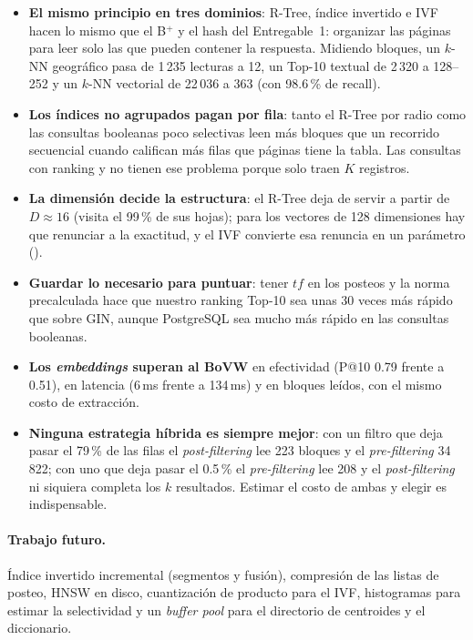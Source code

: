 \begin{itemize}
\item \textbf{El mismo principio en tres dominios}: R-Tree, índice invertido e IVF hacen lo mismo que
  el B$^+$ y el hash del Entregable~1: organizar las páginas para leer solo las que pueden contener la
  respuesta. Midiendo bloques, un $k$-NN geográfico pasa de 1\,235 lecturas a 12, un Top-10 textual
  de 2\,320 a 128--252 y un $k$-NN vectorial de 22\,036 a 363 (con 98.6\,\% de recall).
\item \textbf{Los índices no agrupados pagan por fila}: tanto el R-Tree por radio como las consultas
  booleanas poco selectivas leen más bloques que un recorrido secuencial cuando califican más filas
  que páginas tiene la tabla. Las consultas con ranking y  no tienen ese problema porque
  solo traen $K$ registros.
\item \textbf{La dimensión decide la estructura}: el R-Tree deja de servir a partir de $D\approx16$
  (visita el 99\,\% de sus hojas); para los vectores de 128 dimensiones hay que renunciar a la
  exactitud, y el IVF convierte esa renuncia en un parámetro ().
\item \textbf{Guardar lo necesario para puntuar}: tener $tf$ en los posteos y la norma precalculada
  hace que nuestro ranking Top-10 sea unas 30 veces más rápido que  sobre GIN, aunque
  PostgreSQL sea mucho más rápido en las consultas booleanas.
\item \textbf{Los \emph{embeddings} superan al BoVW} en efectividad (P@10 0.79 frente a 0.51), en
  latencia (6\,ms frente a 134\,ms) y en bloques leídos, con el mismo costo de extracción.
\item \textbf{Ninguna estrategia híbrida es siempre mejor}: con un filtro que deja pasar el 79\,\% de
  las filas el \emph{post-filtering} lee 223 bloques y el \emph{pre-filtering} 34\,822; con uno que
  deja pasar el 0.5\,\% el \emph{pre-filtering} lee 208 y el \emph{post-filtering} ni siquiera
  completa los $k$ resultados. Estimar el costo de ambas y elegir es indispensable.
\end{itemize}

\paragraph{Trabajo futuro.} Índice invertido incremental (segmentos y fusión), compresión de las
listas de posteo, HNSW en disco, cuantización de producto para el IVF, histogramas para estimar la
selectividad y un \emph{buffer pool} para el directorio de centroides y el diccionario.

